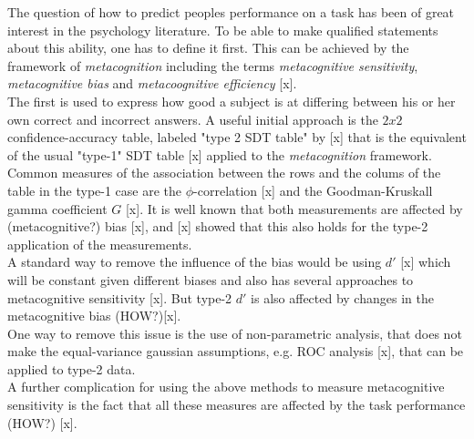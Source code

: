 \documentclass[../main/main.tex]{subfiles}
\begin{document}
	The question of how to predict peoples performance on a task has been of great interest in the psychology literature. To be able to make qualified statements about this ability, one has to define it first.
	This can be achieved by the framework of \textit{metacognition} including the terms \textit{metacognitive sensitivity}, \textit{metacognitive bias} and \textit{metacoognitive efficiency} [x].\\
	The first is used to express how good a subject is at differing between his or her own correct and incorrect answers. A useful initial approach is the $2x2$ confidence-accuracy table, labeled "type 2 SDT table" by [x] that is the equivalent of the usual "type-1" SDT table [x] applied to the \textit{metacognition} framework. Common measures of the association between the rows and the colums of the table in the type-1 case are the $\phi$-correlation [x] and the Goodman-Kruskall gamma coefficient $G$ [x]. It is well known that both measurements are affected by (metacognitive?) bias [x], and [x] showed that this also holds for the type-2 application of the measurements.\\
	A standard way to remove the influence of the bias would be using $d'$ [x] which will be constant given different biases and also has several approaches to metacognitive sensitivity [x]. But type-2 $d'$ is also affected by changes in the metacognitive bias (HOW?)[x].\\
	One way to remove this issue is the use of non-parametric analysis, that does not make the equal-variance gaussian assumptions, e.g. ROC analysis [x], that can be applied to type-2 data.\\
	A further complication for using the above methods to measure metacognitive sensitivity is the fact that all these measures are affected by the task performance (HOW?) [x].
	\\
\end{document}
